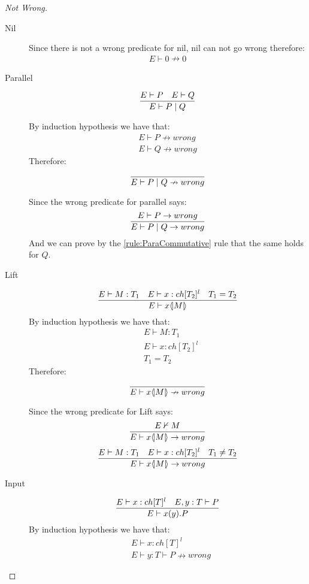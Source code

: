 \begin{proof}[Not Wrong]
	\begin{description}
	\item[Nil]
		Since there is not a wrong predicate for nil, nil can not go wrong therefore:
		\begin{align*}
		E \vdash 0 \nrightarrow 0
		\end{align*}
	\item[Parallel]
		\begin{align*}
		\frac{E \vdash P \quad E \vdash Q }{E \vdash P \mid Q}
		\end{align*}
		
		By induction hypothesis we have that: 
		\begin{align*}
		E \vdash P \nrightarrow wrong\\
		E \vdash Q \nrightarrow wrong
		\end{align*}
		Therefore:
		\begin{align*}
		\frac{}{E \vdash P \mid Q \nrightarrow wrong}
		\end{align*}
		
		Since the wrong predicate for parallel says:
		\begin{align*}
		\frac{E \vdash P \rightarrow wrong}{E \vdash P \mid Q \rightarrow wrong}
		\end{align*}
		And we can prove by the \ref{rule:ParaCommutative} rule that the same holds for $Q$.
	\item[Lift]
		\begin{align*}
		\frac{E \vdash M:T_1 \quad E \vdash x:ch[T_2]^l \quad T_1 = T_2}{E \vdash x \langle \! | M | \! \rangle}
		\end{align*}
		By induction hypothesis we have that:
		\begin{align*}
		&E \vdash M:T_1\\
		&E \vdash x:ch[T_2]^l\\
		&T_1 = T_2
		\end{align*}
		Therefore:
		\begin{align*}
		\frac{}{E \vdash x \langle \! | M | \! \rangle \nrightarrow wrong}
		\end{align*}
		
		Since the wrong predicate for Lift says:
		\begin{align*}
		\frac{E \nvdash M}{E \vdash x \langle \! | M | \! \rangle \rightarrow wrong}
		\end{align*}
		\begin{align*}
		\frac{E \vdash M:T_1 \quad E \vdash x:ch[T_2]^l \quad T_1 \neq T_2}{E \vdash x \langle \! | M | \! \rangle \rightarrow wrong}
		\end{align*}
	\item[Input]
		\begin{align*}
		\frac{E \vdash x:ch[T]^l \quad E,y:T \vdash P}{E \vdash x(y).P}
		\end{align*}
		By induction hypothesis we have that:
		\begin{align*}
		&E \vdash x:ch[T]^l\\
		&E \vdash y:T \vdash P \nrightarrow wrong
		\end{align*}
		

\end{description}
\end{proof}
